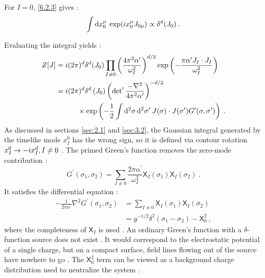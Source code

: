 \begin{tcolorbox}
	\begin{remark}
		For $I=0$, \eqref{6.2.3} gives :
		\[
		\int \mathrm{d} x^{\mu}_{0} \: \exp (i x^{\mu}_{0}J_{0\mu}) \propto \delta^{d}(J_{0}) \:.
		\]
	\end{remark}
\end{tcolorbox}
\noindent Evaluating the integral yields :
\begin{align}
	Z[J] &= i(2 \pi)^{d} \delta^{d}(J_{0}) \prod_{I \neq 0} \left(\frac{4 \pi^{2} \alpha^{\prime}}{\omega_{I}^{2}}\right)^{d / 2} \exp \left(-\frac{\pi \alpha^{\prime} J_{I} \cdot J_{I}}{\omega_{I}^{2}}\right) \nonumber  \\
	&= i(2 \pi)^{d} \delta^{d}\left(J_{0}\right)\left(\operatorname{det}^{\prime} \frac{-\nabla^{2}}{4 \pi^{2} \alpha^{\prime}}\right)^{-d / 2} \nonumber  \\
	& \qquad \quad \times \exp \left(-\frac{1}{2} \int \mathrm{d}^{2} \sigma \, \mathrm{d}^{2} \sigma^{\prime}\: J(\sigma) \cdot J(\sigma^{\prime}) 
	G^{\prime}(\sigma, \sigma^{\prime})\right) \:. \label{6.2.6}
\end{align}
As discussed in sections \ref{sec:2.1} and \ref{sec:3.2}, the Gaussian integral generated by the timelike mode $x_{I}^{0}$ has the wrong sign, so it is defined via contour rotation $x_{I}^{0} \to-i x_{I}^{d}, I \neq 0$ . The primed Green's function removes the zero-mode contribution :
\begin{equation}
	G^{\prime}(\sigma_{1}, \sigma_{2})=\sum_{I \neq 0} \frac{2 \pi \alpha^{\prime}}{\omega_{I}^{2}} \mathsf{X}_{I}(\sigma_{1}) \mathsf{X}_{I}(\sigma_{2}) \:. \label{6.2.7}
\end{equation}
It satisfies the differential equation :
\begin{align}
	-\frac{1}{2 \pi \alpha^{\prime}} \nabla^{2} G^{\prime}(\sigma_{1}, \sigma_{2}) 
	&=\sum_{I \neq 0} \mathsf{X}_{I}(\sigma_{1}) \mathsf{X}_{I}(\sigma_{2})  \nonumber \\
	&=g^{-1 / 2} \delta^{2}(\sigma_{1}-\sigma_{2})-\mathsf{X}_{0}^{2}  \:, \label{6.2.8}
\end{align}
where the completeness of $\mathsf{X}_{I}$ is used . An ordinary Green's function with a $\delta$-function source does not exist . It would correspond to the electrostatic potential of a single charge, but on a compact surface, field lines flowing out of the source have nowhere to go . The $\mathsf{X}_{0}^{2}$ term can be viewed as a background charge distribution used to neutralize the system .

